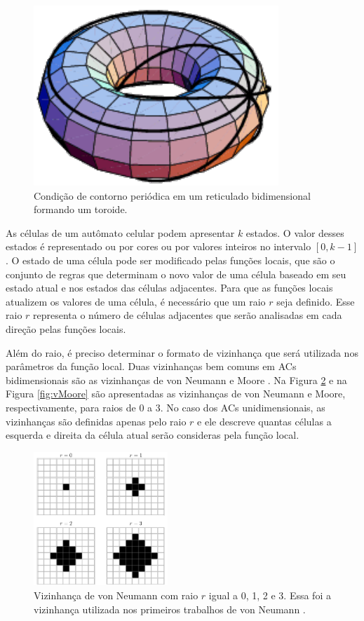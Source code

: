 \documentclass[12pt,a4paper]{article}
\begin{document}
	\begin{figure}[h!]
	  \centering
  	  \includegraphics{fig_toro.pdf}
	  \caption{Condição de contorno periódica em um reticulado bidimensional formando um toroide.}
	  \label{fig:toro}
	\end{figure}


As células de um autômato celular podem apresentar $k$ estados. O valor desses estados é representado ou por cores ou por valores inteiros no intervalo $[0, k-1]$. O estado de uma célula pode ser modificado pelas funções locais, que são o conjunto de regras que determinam o novo valor de uma célula baseado em seu estado atual e nos estados das células adjacentes. Para que as funções locais atualizem os valores de uma célula, é necessário que um raio $r$ seja definido. Esse raio $r$ representa o número de células adjacentes que serão analisadas em cada direção pelas funções locais.

Além do raio, é preciso determinar o formato de vizinhança que será utilizada nos parâmetros da função local. Duas vizinhanças bem comuns em ACs bidimensionais são as vizinhanças de von Neumann \cite{weisstein2015b} e Moore \cite{weisstein2015c}. Na Figura \ref{fig:vVonNeumann} e na Figura \ref{fig:vMoore} são apresentadas as vizinhanças de von Neumann e Moore, respectivamente, para raios de 0 a 3. No caso dos ACs unidimensionais, as vizinhanças são definidas apenas pelo raio $r$ e ele descreve quantas células a esquerda e direita da célula atual serão consideras pela função local.

	\begin{figure}[h!]
	  \centering
	  \includegraphics[width=0.45\textwidth]{fig_vVonNeumann.pdf}
	  \caption{Vizinhança de von Neumann com raio $r$ igual a 0, 1, 2 e 3. Essa foi a vizinhança utilizada nos primeiros trabalhos de von Neumann \cite{weisstein2015b}.}
	  \label{fig:vVonNeumann}
	\end{figure}
\end{document}
